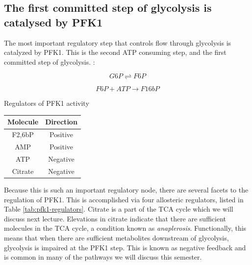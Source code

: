 \documentclass{tufte-handout}
\begin{document}
\subsection{The first committed step of glycolysis is catalysed by PFK1}

The most important regulatory step that controls flow through glycolysis is catalyzed by PFK1.  This is the second ATP consuming step, and the first committed step of glycolysis.  :

\begin{equation}\label{eq:pgm}
G6P \rightleftharpoons F6P
\end{equation}

\begin{equation}\label{eq:pfk1}
F6P + ATP \rightarrow F16bP
\end{equation}

\begin{margintable}
\centering
\caption{Regulators of PFK1 activity}
\label{tab:pfk1-regulators}
\begin{tabular}{cc}
\hline
\textbf {Molecule} & \textbf{Direction}  \\
\hline
F2,6bP & Positive \\
AMP & Positive \\
ATP & Negative \\
Citrate & Negative \\
\hline
\end{tabular}
\end{margintable}

Because this is such an important regulatory node, there are several facets to the regulation of PFK1.  This is accomplished via four allosteric regulators, listed in Table \ref{tab:pfk1-regulators}.  Citrate is a part of the TCA cycle which we will discuss next lecture.  Elevations in citrate indicate that there are sufficient molecules in the TCA cycle, a condition known as \emph{anaplerosis}.  Functionally, this means that when there are sufficient metabolites downstream of glycolysis, glycolysis is impaired at the PFK1 step.  This is known as negative feedback and is common in many of the pathways we will discuss this semester.
\end{document}
